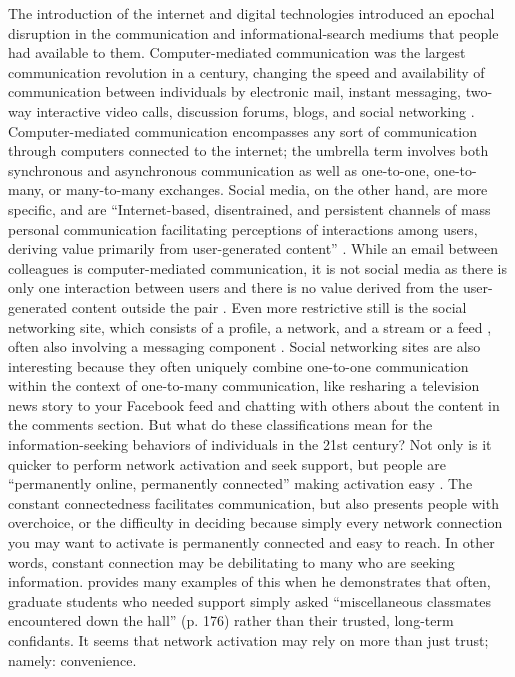 The introduction of the internet and digital technologies introduced an epochal
disruption in the communication and informational-search mediums that people had
available to them. Computer-mediated communication was the largest communication
revolution in a century, changing the speed and availability of communication
between individuals by electronic mail, instant messaging, two-way interactive
video calls, discussion forums, blogs, and social networking
\citep{rainie2012networked}. Computer-mediated communication encompasses any
sort of communication through computers connected to the internet; the umbrella
term involves both synchronous and asynchronous communication as well as
one-to-one, one-to-many, or many-to-many exchanges. Social media, on the other
hand, are more specific, and are ``Internet-based, disentrained, and persistent
channels of mass personal communication facilitating perceptions of interactions
among users, deriving value primarily from user-generated content'' \citep[][p.
50]{carr2015social}. While an email between colleagues is computer-mediated
communication, it is not social media as there is only one interaction between
users and there is no value derived from the user-generated content outside the
pair \citep{bayer_etal20}. Even more restrictive still is the social networking
site, which consists of a profile, a network, and a stream or a feed
\citep{boyd2007social, ellison2013sociality},  often also involving a messaging
component  \citep{bayer_etal20}. Social networking sites are also interesting
because they often uniquely combine one-to-one communication within the context
of one-to-many communication, like resharing a television news story to your
Facebook feed and chatting with others about the content in the comments
section. But what do these classifications mean for the information-seeking
behaviors of individuals in the 21st century? Not only is it quicker to perform
network activation and seek support, but people are ``permanently online,
permanently connected'' making activation easy \citep{vorderer2017permanently}.
The constant connectedness facilitates communication, but also presents people
with overchoice, or the difficulty in deciding because simply every network
connection you may want to activate is permanently connected and easy to reach.
In other words, constant connection may be debilitating to many who are seeking
information. \citet{smallSomeoneTalk2017} provides many examples of this when he
demonstrates that often, graduate students who needed support simply asked
``miscellaneous classmates encountered down the hall'' (p. 176) rather than their
trusted, long-term confidants. It seems that network activation may rely on more
than just trust; namely: convenience.

